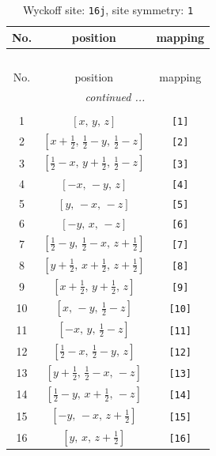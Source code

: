 \documentclass[fleqn,8pt]{jsarticle}
\begin{document}
\begin{longtable}{ccc}
\caption{Wyckoff site: {\tt 16j}, site symmetry: {\tt 1}}
 \\
 \hline \hline
No. & position & mapping \\ \hline \endfirsthead

\multicolumn{2}{l}{\tablename\ \thetable{}} \\
 \hline \hline
No. & position & mapping \\ \hline \endhead

 \hline \hline
\multicolumn{2}{r}{\footnotesize\it continued ...} \\ \endfoot

 \hline \hline
\multicolumn{2}{r}{} \\ \endlastfoot

1 & $\left[ x,\, y,\, z \right]$ & {\tt [1]} \\ \hline
2 & $\left[ x + \frac{1}{2},\, \frac{1}{2} - y,\, \frac{1}{2} - z \right]$ & {\tt [2]} \\ \hline
3 & $\left[ \frac{1}{2} - x,\, y + \frac{1}{2},\, \frac{1}{2} - z \right]$ & {\tt [3]} \\ \hline
4 & $\left[ - x,\, - y,\, z \right]$ & {\tt [4]} \\ \hline
5 & $\left[ y,\, - x,\, - z \right]$ & {\tt [5]} \\ \hline
6 & $\left[ - y,\, x,\, - z \right]$ & {\tt [6]} \\ \hline
7 & $\left[ \frac{1}{2} - y,\, \frac{1}{2} - x,\, z + \frac{1}{2} \right]$ & {\tt [7]} \\ \hline
8 & $\left[ y + \frac{1}{2},\, x + \frac{1}{2},\, z + \frac{1}{2} \right]$ & {\tt [8]} \\ \hline
9 & $\left[ x + \frac{1}{2},\, y + \frac{1}{2},\, z \right]$ & {\tt [9]} \\ \hline
10 & $\left[ x,\, - y,\, \frac{1}{2} - z \right]$ & {\tt [10]} \\ \hline
11 & $\left[ - x,\, y,\, \frac{1}{2} - z \right]$ & {\tt [11]} \\ \hline
12 & $\left[ \frac{1}{2} - x,\, \frac{1}{2} - y,\, z \right]$ & {\tt [12]} \\ \hline
13 & $\left[ y + \frac{1}{2},\, \frac{1}{2} - x,\, - z \right]$ & {\tt [13]} \\ \hline
14 & $\left[ \frac{1}{2} - y,\, x + \frac{1}{2},\, - z \right]$ & {\tt [14]} \\ \hline
15 & $\left[ - y,\, - x,\, z + \frac{1}{2} \right]$ & {\tt [15]} \\ \hline
16 & $\left[ y,\, x,\, z + \frac{1}{2} \right]$ & {\tt [16]} \\
\end{longtable}
\end{document}
